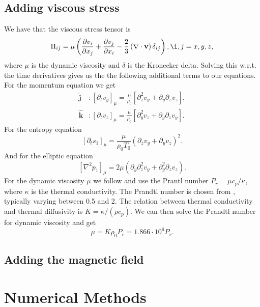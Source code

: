 \subsection{Adding viscous stress}
We have that the viscous stress tensor is \citep{2021LRSP...18....5F}
\begin{equation}
\Pi_{ij} = \mu \left(\frac{\partial v_i}{\partial x_j} + \frac{\partial v_j}{\partial x_i}-\frac{2}{3}\left(\nabla\cdot\mathbf{v}\right)\delta_{ij}  \right),\i,j=x,y,z,
\end{equation}
where $\mu$ is the dynamic viscosity and $\delta$ is the Kronecker delta. Solving this w.r.t. the time derivatives gives us the the following additional terms to our equations. For the momentum equation we get
\begin{align}
    \mathbf{\hat{j}} &: \left[\partial_t v_y\right]_{\mu} = \frac{\mu}{\rho_0}\left[ \partial_z^2 v_y + \partial_y\partial_z v_z  \right],\\
    \mathbf{\hat{k}} &: \left[\partial_t v_z\right]_{\mu} = \frac{\mu}{\rho_0}\left[ \partial_y^2 v_z + \partial_y\partial_z v_y \right].
\end{align}
For the entropy equation
\begin{equation}
    \left[\partial_t s_1\right]_{\mu} =\frac{\mu}{\rho_0 T_0}(\partial_zv_y+\partial_yv_z)^2.
\end{equation}
And for the elliptic equation 
\begin{equation}
    \left[\nabla^2 p_1\right]_{\mu} = 2\mu(\partial_y\partial_z^2v_y+\partial_y^2\partial_zv_z).
\end{equation}
For the dynamic viscosity $\mu$ we follow \citep{1999ApJS..121..247L} and use the Prantl number $P_r=\mu c_p/\kappa$, where $\kappa$ is the thermal conductivity. The Prandtl number is chosen from \citep{1995ApJ...441..903L}, typically varying between 0.5 and 2. The relation between thermal conductivity and thermal diffusivity is $K=\kappa/(\rho c_p)$. We can then solve the Prandtl number for dynamic viscosity and get
\begin{equation}
    \mu = K\rho_0 P_r = 1.866\cdot 10^6 P_r.
\end{equation}

\subsection{Adding the magnetic field}

\section{Numerical Methods}
